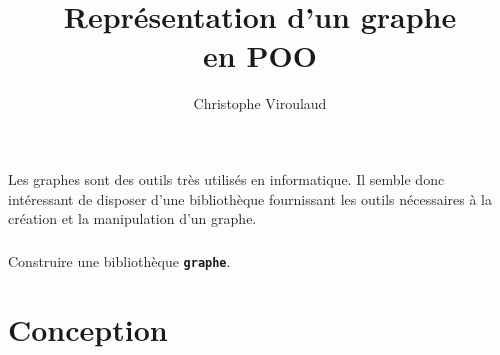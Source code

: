 \documentclass[svgnames,11pt]{beamer}
\author[]{Christophe Viroulaud}
\title{Représentation d'un graphe\\en POO}
\date{\framebox{\textbf{Algo 22}}}
\institute{Terminale - NSI}
\begin{document}
\begin{frame}
\titlepage
\end{frame}
\begin{frame}
    \frametitle{}

    \begin{center}
        Les graphes sont des outils très utilisés en informatique. Il semble donc intéressant de disposer d'une bibliothèque fournissant les outils nécessaires à la création et la manipulation d'un graphe.
    \end{center}

\end{frame}
\begin{frame}
    \frametitle{}

    \begin{framed}
        \centering Construire une bibliothèque \textbf{\texttt{graphe}}.
    \end{framed}

\end{frame}
\section{Conception}
\end{document}
